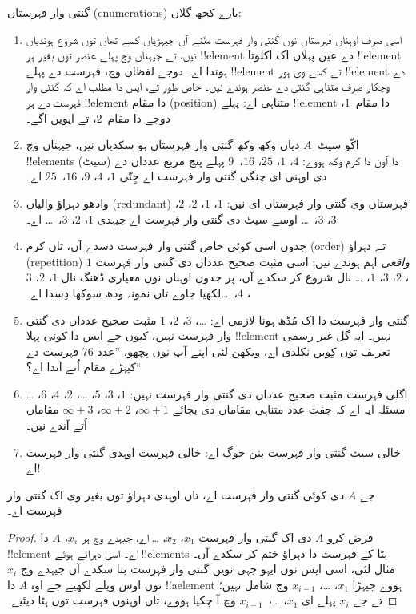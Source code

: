\documentclass[../../../include/open-logic-section]{subfiles}
\begin{document}
\begin{explain}
گنتی وار فہرستاں (enumerations) بارے کجھ گلاں:
\begin{enumerate}
\item اسی صرف اوہناں فہرستاں نوں گنتی وار فہرست منّنے آں جیہڑیاں
  کسے تھاں توں شروع ہوندیاں نیں، تے جیہناں وچ پہلے عنصر توں
  بغیر ہر !!{element} دے عین پہلاں اک اکلوتا !!{element} ہوندا اے۔
  دوجے لفظاں وچ، فہرست دے پہلے !!{element} تے کسے وی ہور !!{element}
  دے وچکار صرف متناہی گنتی دے عنصر ہوندے نیں۔ خاص طور تے، ایس دا
  مطلب اے کہ گنتی وار فہرست دے ہر !!{element} دا مقام (position) متناہی اے: پہلے
  !!{element} دا مقام~$1$، دوجے دا مقام~$2$، تے ایویں اگے۔
\item اکّو سیٹ~$A$ دیاں وکھ وکھ گنتی وار فہرستاں ہو سکدیاں نیں، جیہناں
  وچ !!{element}s دا آون دا کرم وکھ ہووے: $4$، $1$، $25$، $16$،~$9$
  پہلے پنج مربع عدداں دے (سیٹ) دی اوہنی ای چنگی گنتی وار فہرست اے
  جِنّی $1$، $4$، $9$، $16$،~$25$ اے۔
\item وادھو دہراؤ والیاں (redundant) فہرستاں وی گنتی وار فہرستاں ای نیں: $1$،
  $1$، $2$، $2$، $3$، $3$،~\dots{} اوسے سیٹ دی گنتی وار فہرست اے
  جیہدی $1$، $2$، $3$،~\dots{} اے۔
\item جدوں اسی کوئی خاص گنتی وار فہرست دسدے آں، تاں کرم (order) تے
  دہراؤ (repetition)
  \emph{واقعی} اہم ہوندے نیں: اسی مثبت صحیح عدداں دی گنتی وار فہرست
  $1$، $2$، $3$، $1$، \dots{} نال شروع کر سکدے آں، پر جدوں اوہناں نوں
  معیاری ڈھنگ نال $1$، $2$، $3$، $4$،~\dots لکھیا جاوے تاں نمونہ
  ودھ سوکھا دِسدا اے۔
\item گنتی وار فہرست دا اک مُڈھ ہونا لازمی اے: \dots، $3$، $2$، $1$
  مثبت صحیح عدداں دی گنتی وار فہرست نہیں، کیوں جے ایس دا کوئی پہلا
  !!{element} نہیں۔ ایہ گل غیر رسمی تعریف توں کِویں نکلدی اے، ویکھن
  لئی اپنے آپ نوں پچھو، ”عدد 76 فہرست دے کیہڑے مقام اُتے آندا اے؟“
\item اگلی فہرست مثبت صحیح عدداں دی گنتی وار فہرست نہیں:
  $1$، $3$، $5$، \dots، $2$، $4$، $6$، \dots\@ مسئلہ ایہ اے کہ
  جفت عدد متناہی مقاماں دی بجائے $\infty + 1$، $\infty + 2$،
  $\infty + 3$ مقاماں اُتے آندے نیں۔
\item خالی سیٹ گنتی وار فہرست بنن جوگ اے: خالی فہرست اوہدی گنتی وار فہرست اے!{}
\end{enumerate}
\end{explain}

\begin{prop}
  جے $A$ دی کوئی گنتی وار فہرست اے، تاں اوہدی دہراؤ توں بغیر وی اک
  گنتی وار فہرست اے۔
\end{prop}

\begin{proof}
  فرض کرو $A$ دی اک گنتی وار فہرست $x_1$، $x_2$، \dots{} اے، جیہدے
  وچ ہر $x_i$، $A$ دا !!{element} اے۔ اسی دہرائے ہوئے !!{element}s
  ہٹا کے فہرست دا دہراؤ ختم کر سکدے آں۔ مثال لئی، اسی ایس نوں ایہو
  جہی نویں گنتی وار فہرست بنا سکدے آں جیہدے وچ $x_i$ نوں اوس ویلے
  لکھیے جے اوہ $A$ دا !!a{element} ہووے جیہڑا $x_1$، \dots،
  $x_{i-1}$ وچ شامل نہیں؛ تے جے $x_i$ پہلے ای $x_1$، \dots،~$x_{i-1}$
  وچ آ چکیا ہووے، تاں اوہنوں فہرست توں ہٹا دیئیے۔
\end{proof}
\end{document}
